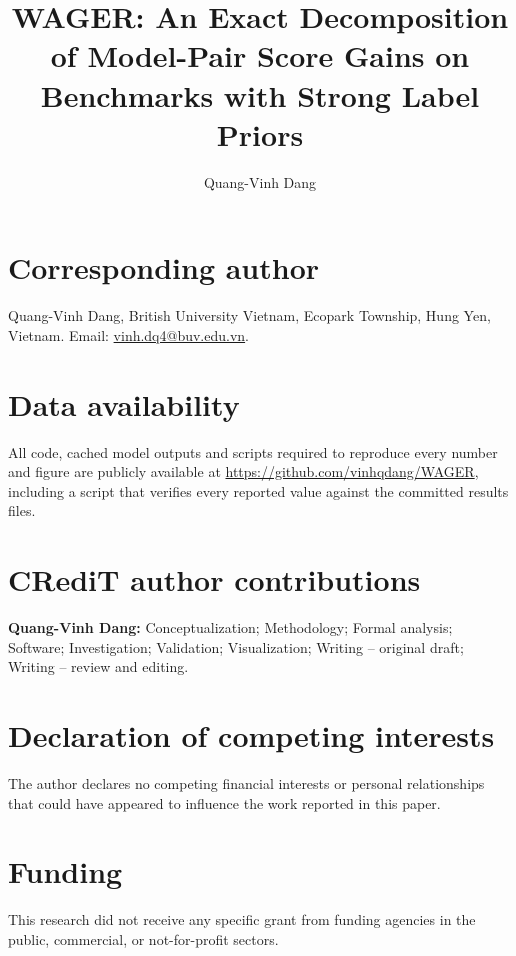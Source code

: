 \documentclass[preprint,times]{elsarticle}
\begin{document}
\begin{frontmatter}

\title{\fontsize{14}{17}\selectfont WAGER: An Exact Decomposition of Model-Pair
Score Gains on Benchmarks with Strong Label Priors}

\author{Quang-Vinh Dang}
\address{British University Vietnam, Ecopark Township, Hung Yen, Vietnam}

\end{frontmatter}

\section*{Corresponding author}
Quang-Vinh Dang, British University Vietnam, Ecopark Township, Hung Yen, Vietnam.
Email: \url{vinh.dq4@buv.edu.vn}.

\section*{Data availability}
All code, cached model outputs and scripts required to reproduce every number and figure
are publicly available at \url{https://github.com/vinhqdang/WAGER}, including a script
that verifies every reported value against the committed results files.

\section*{CRediT author contributions}
\textbf{Quang-Vinh Dang:} Conceptualization; Methodology; Formal analysis; Software;
Investigation; Validation; Visualization; Writing -- original draft; Writing -- review
and editing.

\section*{Declaration of competing interests}
The author declares no competing financial interests or personal relationships that
could have appeared to influence the work reported in this paper.

\section*{Funding}
This research did not receive any specific grant from funding agencies in the public,
commercial, or not-for-profit sectors.
\end{document}
